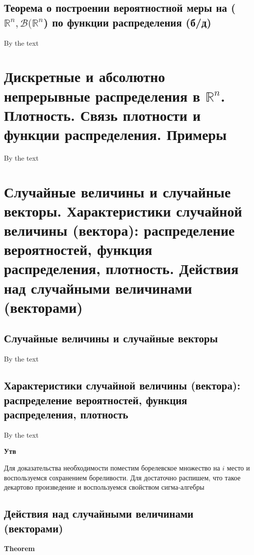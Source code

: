 \documentclass[a4paper, 14pt]{article}
\begin{document}
    \subsection{Теорема о построении вероятностной меры на ($\mathbb{R}^n, \mathcal{B}(\mathbb{R}^n$) по функции
    распределения (б/д)}
    
    By the text
    
    \section{Дискретные и абсолютно непрерывные распределения в $\mathbb{R}^n$.
    Плотность.
    Связь плотности и функции распределения.
    Примеры}
    
    By the text
    
    \section{Случайные величины и случайные векторы.
    Характеристики случайной величины (вектора): распределение вероятностей, функция распределения, плотность.
    Действия над случайными величинами (векторами)}
    
    \subsection{Случайные величины и случайные векторы}
    
    By the text
    
    \subsection{Характеристики случайной величины (вектора): распределение вероятностей, функция распределения, плотность}
    
    By the text
    
    \textbf{Утв}
    
    Для доказательства необходимости поместим борелевское множество на $i$ место и воспользуемся сохранением
    бореливости.
    Для достаточно распишем, что такое декартово произведение и воспользуемся свойством сигма-алгебры
    
    \subsection{Действия над случайными величинами (векторами)}
    
    \textbf{Theorem}
    
\end{document}
